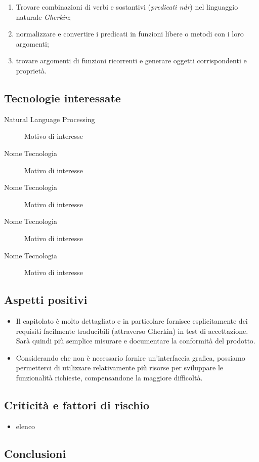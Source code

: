 \documentclass[../studio-di-fattibilita.tex]{subfiles}
\begin{document}
    \begin{enumerate}
      \item Trovare combinazioni di verbi e sostantivi (\textit{predicati ndr}) nel
      linguaggio naturale \textit{Gherkin};
      \item normalizzare e convertire i predicati in funzioni libere o metodi con i loro argomenti;
      \item trovare argomenti di funzioni ricorrenti e generare oggetti corrispondenti e proprietà.
    \end{enumerate}



  \subsection{Tecnologie interessate} \label{subsec:tecnologie_interessate}

  \begin{description}
    \item[Natural Language Processing] Motivo di interesse
    \item[Nome Tecnologia] Motivo di interesse
    \item[Nome Tecnologia] Motivo di interesse
    \item[Nome Tecnologia] Motivo di interesse
    \item[Nome Tecnologia] Motivo di interesse
  \end{description}



  \subsection{Aspetti positivi} \label{subsec:aspetti_positivi}

  \begin{itemize}
    \item Il capitolato è molto dettagliato e in particolare fornisce esplicitamente dei requisiti facilmente traducibili (attraverso Gherkin) in test di accettazione. Sarà quindi più semplice misurare e documentare la conformità del prodotto.
    \item Considerando che non è necessario fornire un'interfaccia grafica, possiamo permetterci di utilizzare relativamente più risorse per sviluppare le funzionalità richieste, compensandone la maggiore difficoltà.
  \end{itemize}


  \subsection{Criticità e fattori di rischio} \label{subsec:criticità_e_fattori_di_rischio}

  \begin{itemize}
    \item elenco
  \end{itemize}



  \subsection{Conclusioni} \label{subsec:conclusioni}

\end{document}
